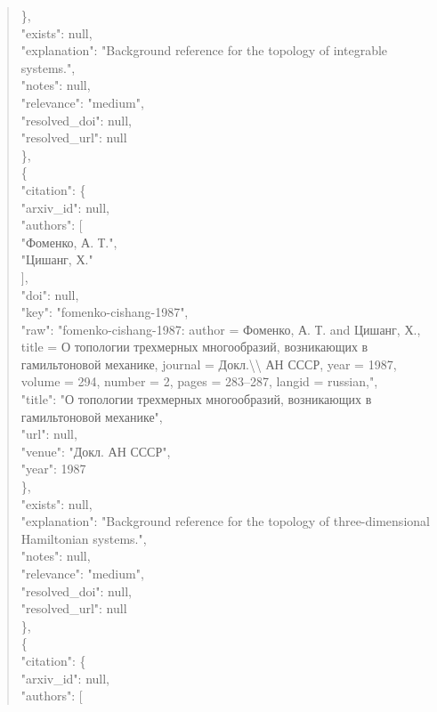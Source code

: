 \documentclass[11pt]{article}
\begin{document}
\begin{quote}
      \},\\
      "exists": null,\\
      "explanation": "Background reference for the topology of integrable systems.",\\
      "notes": null,\\
      "relevance": "medium",\\
      "resolved\_doi": null,\\
      "resolved\_url": null\\
    \},\\
    \{\\
      "citation": \{\\
        "arxiv\_id": null,\\
        "authors": [\\
          "Фоменко, А. Т.",\\
          "Цишанг, Х."\\
        ],\\
        "doi": null,\\
        "key": "fomenko-cishang-1987",\\
        "raw": "fomenko-cishang-1987: author = Фоменко, А. Т. and Цишанг, Х., title = О топологии трехмерных многообразий, возникающих в гамильтоновой механике, journal = Докл.\textbackslash{}\textbackslash{} АН СССР, year = 1987, volume = 294, number = 2, pages = 283--287, langid = russian,",\\
        "title": "О топологии трехмерных многообразий, возникающих в гамильтоновой механике",\\
        "url": null,\\
        "venue": "Докл. АН СССР",\\
        "year": 1987\\
      \},\\
      "exists": null,\\
      "explanation": "Background reference for the topology of three-dimensional Hamiltonian systems.",\\
      "notes": null,\\
      "relevance": "medium",\\
      "resolved\_doi": null,\\
      "resolved\_url": null\\
    \},\\
    \{\\
      "citation": \{\\
        "arxiv\_id": null,\\
        "authors": [\\

\end{quote}
\end{document}
